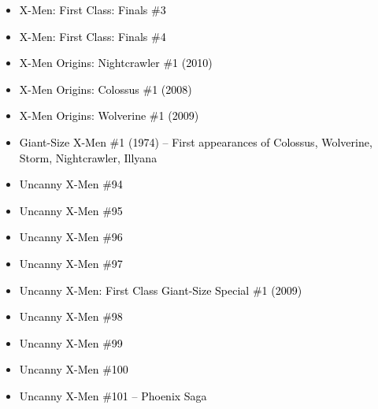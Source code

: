 \documentclass[12pt]{article}
\newcommand{\checkbox}{\raisebox{0.0ex}{\fbox{\rule{0ex}{1.5ex} \rule{1.5ex}{0ex}}}}
\begin{document}
\vspace{0.3cm}
\noindent
\begin{tcolorbox}[
  colback=white!95!gray,
  colframe=black,
  width=\textwidth,
  arc=4mm,
  auto outer arc,
  boxrule=0.8pt,
  left=8pt,right=8pt,top=8pt,bottom=8pt
]
\begin{itemize}[left=0pt,label={\checkbox}]
  \item \textcolor{black}{X-Men: First Class: Finals \#3}
  \item \textcolor{black}{X-Men: First Class: Finals \#4}
  \item \textcolor{black}{X-Men Origins: Nightcrawler \#1 (2010)}
  \item \textcolor{black}{X-Men Origins: Colossus \#1 (2008)}
  \item \textcolor{black}{X-Men Origins: Wolverine \#1 (2009)}
  \item \textcolor{black}{Giant-Size X-Men \#1 (1974) – First appearances of Colossus, Wolverine, Storm, Nightcrawler, Illyana}
  \item \textcolor{black}{Uncanny X-Men \#94}
  \item \textcolor{black}{Uncanny X-Men \#95}
  \item \textcolor{black}{Uncanny X-Men \#96}
  \item \textcolor{black}{Uncanny X-Men \#97}
  \item \textcolor{black}{Uncanny X-Men: First Class Giant-Size Special \#1 (2009)}
  \item \textcolor{black}{Uncanny X-Men \#98}
  \item \textcolor{black}{Uncanny X-Men \#99}
  \item \textcolor{black}{Uncanny X-Men \#100}
  \item \textcolor{black}{Uncanny X-Men \#101 – Phoenix Saga}
\end{itemize}
\end{tcolorbox}

\newpage
{}
\end{document}
